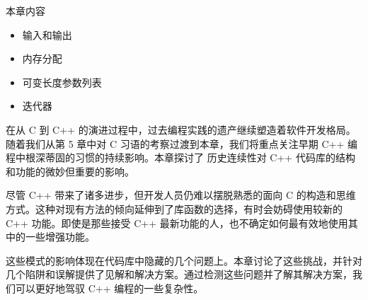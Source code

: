 本章内容

\begin{itemize}
\item
输入和输出

\item
内存分配

\item
可变长度参数列表

\item
迭代器
\end{itemize}

在从 C 到 C++ 的演进过程中，过去编程实践的遗产继续塑造着软件开发格局。随着我们从第 5 章中对 C 习语的考察过渡到本章，我们将重点关注早期 C++ 编程中根深蒂固的习惯的持续影响。本章探讨了 历史连续性对 C++ 代码库的结构和功能的微妙但重要的影响。

尽管 C++ 带来了诸多进步，但开发人员仍难以摆脱熟悉的面向 C 的构造和思维方式。这种对现有方法的倾向延伸到了库函数的选择，有时会妨碍使用较新的 C++ 功能。即使是那些接受 C++ 最新功能的人，也不确定如何最有效地使用其中的一些增强功能。

这些模式的影响体现在代码库中隐藏的几个问题上。本章讨论了这些挑战，并针对几个陷阱和误解提供了见解和解决方案。通过检测这些问题并了解其解决方案，我们可以更好地驾驭 C++ 编程的一些复杂性。




